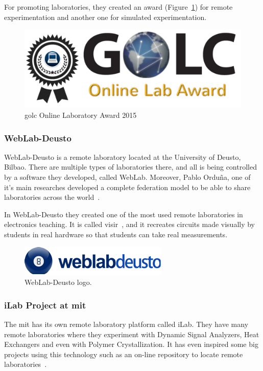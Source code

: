 For promoting laboratories, they created an award (Figure~\ref{fig:golc_award}) for remote
experimentation and another one for simulated experimentation.

\begin{figure}[!htbp]
	\centering
	\includegraphics[width=.4\textwidth]{fig/golc_award}
	\caption{\acrshort{golc} Online Laboratory Award 2015}\label{fig:golc_award}
\end{figure}

\subsubsection{WebLab-Deusto}

WebLab-Deusto is a remote laboratory located at the University of Deusto, Bilbao. There are multiple
types of laboratories there, and all is being controlled by a software they developed, called
WebLab. Moreover, Pablo Orduña, one of it's main researches developed a complete federation model
to be able to share laboratories across the world~\cite{porduna_phd}.

In WebLab-Deusto they created one of the most used remote laboratories in electronics teaching. It
is called \acrshort{visir}~\cite{visir}, and it recreates circuits made visually by students in real
hardware so that students can take real measurements.

\begin{figure}[!htbp]
	\centering
	\includegraphics[width=.4\textwidth]{fig/weblab}
	\caption{WebLab-Deusto logo.}
\end{figure}

\subsubsection{iLab Project at \acrshort{mit}}

The \acrlong{mit} has its own remote laboratory platform called iLab. They
have many remote laboratories where they experiment with Dynamic Signal Analyzers, Heat Exchangers
and even with Polymer Crystallization. It has even inspired some big projects using this technology
such as an on-line repository to locate remote laboratories~\cite{ilabs_multi}.

